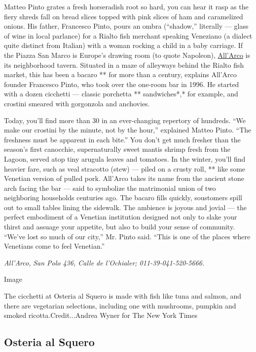 Matteo Pinto grates a fresh horseradish root so hard, you can hear it
rasp as the fiery shreds fall on bread slices topped with pink slices of
ham and caramelized onions. His father, Francesco Pinto, pours an ombra
(``shadow,'' literally --- glass of wine in local parlance) for a Rialto
fish merchant speaking Veneziano (a dialect quite distinct from Italian)
with a woman rocking a child in a baby carriage. If the Piazza San Marco
is Europe's drawing room (to quote Napoleon),
\href{https://www.google.com/search?q=All\%E2\%80\%99Arco\&oq=All\%E2\%80\%99Arco\&aqs=chrome..69i57j0l5.1342j0j8\&sourceid=chrome\&ie=UTF-8}{All'Arco}
is its neighborhood tavern. Situated in a maze of alleyways behind the
Rialto fish market, this has been a bacaro ** for more than a century,
explains All'Arco founder Francesco Pinto, who took over the one-room
bar in 1996. He started with a dozen cicchetti --- classic porchetta **
sandwiches*,* for example, and crostini smeared with gorgonzola and
anchovies.

Today, you'll find more than 30 in an ever-changing repertory of
hundreds. ``We make our crostini by the minute, not by the hour,''
explained Matteo Pinto. ``The freshness must be apparent in each bite.''
You don't get much fresher than the season's first canocchie,
supernaturally sweet mantis shrimp fresh from the Lagoon, served atop
tiny arugula leaves and tomatoes. In the winter, you'll find heavier
fare, such as veal stracotto (stew) --- piled on a crusty roll, ** like
some Venetian version of pulled pork. All'Arco takes its name from the
ancient stone arch facing the bar --- said to symbolize the matrimonial
union of two neighboring households centuries ago. The bacaro fills
quickly, soustomers spill out to small tables lining the sidewalk. The
ambience is joyous and jovial --- the perfect embodiment of a Venetian
institution designed not only to slake your thirst and assuage your
appetite, but also to build your sense of community. ``We've lost so
much of our city,'' Mr. Pinto said. ``This is one of the places where
Venetians come to feel Venetian.''

\emph{All'Arco,} \emph{San Polo 436, Calle de l'Ochialer;
011-39-041-520-5666.}

Image

The cicchetti at Osteria al Squero is made with fish like tuna and
salmon, and there are vegetarian selections, including one with
mushrooms, pumpkin and smoked ricotta.Credit...Andrea Wyner for The New
York Times

\hypertarget{osteria-al-squero}{%
\subsection{Osteria al Squero}\label{osteria-al-squero}}

